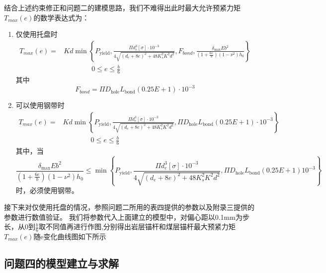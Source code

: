 \documentclass[UTF-8,a4paper,zihao=-4]{ctexart}
\begin{document}
结合上述约束修正和问题二的建模思路，我们不难得出此时最大允许预紧力矩$T_{max}(e)$的数学表达式为：
\begin{enumerate}
    \item 仅使用托盘时
    \begin{equation}
    \begin{aligned}
        T_{max}(e)=&Kd\min
    \left\{
    P_{\mathrm{yield}},
    \frac{\Pi d_e^3[\sigma]\cdot 10^{-3}}{4\sqrt{(d_e+8e)^2+48K_s^2K^2d^2}} ,
   F_{bond},
    \frac{\delta_{\max}Eb^2}{(1+\frac{6e}{b})(1-\nu^2)h_0}
    \right\}\\
    &\qquad\qquad
    0\le e\le\frac{b}{6}
    \end{aligned}
    \end{equation}
    其中\[F_{bond}=\Pi D_{\mathrm{hole}}
    L_{\mathrm{bond}}
    (0.25E+1) \cdot 10^{-3}\]
    \item 可以使用钢带时
     \begin{equation}
     \begin{aligned}
        T_{max}(e)=&Kd\min
    \left\{
    P_{\mathrm{yield}},
    \frac{\Pi d_e^3[\sigma]\cdot 10^{-3}}{4\sqrt{(d_e+8e)^2+48K_s^2K^2d^2}} ,
   \Pi D_{\mathrm{hole}}
    L_{\mathrm{bond}}
    (0.25E+1) \cdot 10^{-3}
    \right\}\\
    &\qquad\qquad
    0\le e\le\frac{b}{6}
    \end{aligned}
     \end{equation}
    其中，当\[\frac{\delta_{\max}Eb^2}{(1+\frac{6e}{b})(1-\nu^2)h_0}\le \min
    \left\{
    P_{\mathrm{yield}},
    \frac{\Pi d_e^3[\sigma]\cdot 10^{-3}}{4\sqrt{(d_e+8e)^2+48K_s^2K^2d^2}} ,
   \Pi D_{\mathrm{hole}}
    L_{\mathrm{bond}}
    (0.25E+1)10^{-3}
    \right\}\]时，必须使用钢带。
\end{enumerate}

接下来对仅使用托盘的情况，参照问题二所用的表四提供的参数以及附录三提供的参数进行数值验证。
我们将参数代入上面建立的模型中，对偏心距以0.1mm为步长，从0到$\frac{b}{6}$取不同值再进行作图,分别得出岩层锚杆和煤层锚杆最大预紧力矩$T_{max}(e)$随e变化曲线图如下所示



\subsection{问题四的模型建立与求解}
\end{document}

